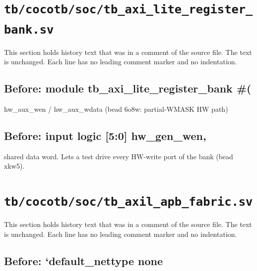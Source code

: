 \section{\texttt{tb/cocotb/soc/tb\_axi\_lite\_register\_bank.sv}}\label{cr:suite:soc-tb-axi-lite-register-bank-sv}

This section holds history text that was in a comment of the source file. The text is unchanged. Each line has no leading comment marker and no indentation.

\begin{record}

\subsection*{Before: module tb\_axi\_lite\_register\_bank \#(}

\begin{textblock}
               hw_aux_wen / hw_aux_wdata (bead 6o8w: partial-WMASK HW path)
\end{textblock}

\subsection*{Before: input  logic [5:0]        hw\_gen\_wen,}

\begin{textblock}
shared data word.  Lets a test drive every HW-write port of the bank (bead xkw5).
\end{textblock}

\end{record}

\section{\texttt{tb/cocotb/soc/tb\_axil\_apb\_fabric.sv}}\label{cr:suite:soc-tb-axil-apb-fabric-sv}

This section holds history text that was in a comment of the source file. The text is unchanged. Each line has no leading comment marker and no indentation.

\begin{record}

\subsection*{Before: `default\_nettype none}


\end{record}

